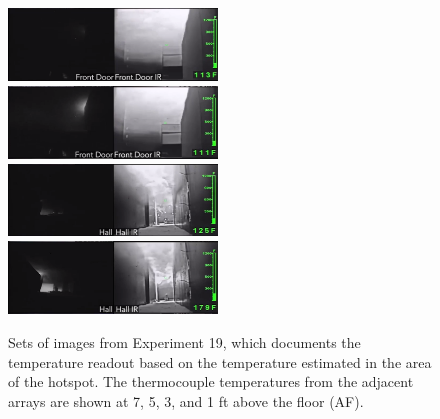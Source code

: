 \documentclass[12pt,oneside]{book}
\begin{document}
\begin{figure}[H]
\centering
\includegraphics[width=0.495\textwidth]{../0_Images/Tactical_Considerations/Thermal_Imager/Exp19FD_5_3min.png}
\includegraphics[width=0.495\textwidth]{../0_Images/Tactical_Considerations/Thermal_Imager/Exp19FD_5min.png}
\includegraphics[width=0.495\textwidth]{../0_Images/Tactical_Considerations/Thermal_Imager/Exp19Hall_5_3min.png}
\includegraphics[width=0.495\textwidth]{../0_Images/Tactical_Considerations/Thermal_Imager/Exp19Hall_5min.png}
\caption[Thermal Imager J]{Sets of images from Experiment 19, which documents the temperature readout based on the temperature estimated in the area of the hotspot. The thermocouple temperatures from the adjacent arrays are shown at 7, 5, 3, and 1 ft above the floor (AF).}
\label{fig:thermal_imager_j}
\end{figure}
\end{document}
